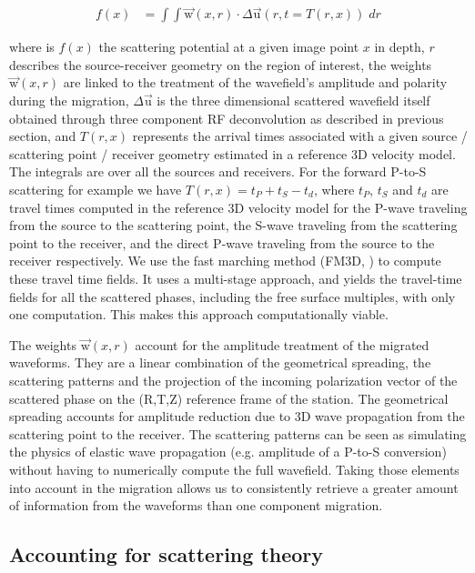 \documentclass[9pt,a4paper]{article}
\numberwithin{equation}{section}
\begin{document}
\begin{multicols}{2}
\begin{align}
  f(x) &= \int\!\!\!\!\int \vec{\text{w}}(x,r) \cdot \Delta\vec{\text{u}}(r,t=T(r,x)) \; dr
  \label{gen}
\end{align}
\vspace{1mm}

\noindent where is $f(x)$ the scattering potential at a given image point $x$ in depth, 
$r$ describes the source-receiver geometry on the region of interest, 
the weights $\vec{\text{w}}(x,r)$ are linked to the treatment of the wavefield’s amplitude and polarity during the migration, 
$\Delta\vec{\text{u}}$ is the three dimensional scattered wavefield itself obtained through three component RF deconvolution as described in previous section, 
and $T(r,x)$ represents the arrival times associated with a given source / scattering point / receiver geometry estimated in a reference 3D velocity model. 
The integrals are over all the sources and receivers.
For the forward P-to-S scattering for example we have $T(r,x) = t_P + t_S - t_d$, where $t_P$, $t_S$ and $t_d$ are travel times computed in the reference 3D velocity model for the P-wave traveling from the source to the scattering point, the S-wave traveling from the scattering point to the receiver, and the direct P-wave traveling  from the source to the receiver respectively. 
We use the fast marching method (FM3D, \cite{deko_gji_06}) to compute these travel time fields. 
It uses a multi-stage approach, and yields the travel-time fields for all the scattered phases, including the free surface multiples, with only one computation. 
This makes this approach computationally viable. 


The weights $\vec{\text{w}}(x,r)$ account for the amplitude treatment of the migrated waveforms. 
They are a linear combination of the geometrical spreading, the scattering patterns and the projection of the incoming polarization vector of the scattered phase on the (R,T,Z) reference frame of the station.
The geometrical spreading accounts for amplitude reduction due to 3D wave propagation from the scattering point to the receiver.
The scattering patterns can be seen as simulating the physics of elastic wave propagation (e.g. amplitude of a P-to-S conversion) without having to numerically compute the full wavefield.
Taking those elements into account in the migration allows us to consistently retrieve a greater amount of information from the waveforms than one component migration.

\subsection{Accounting for scattering theory}


\end{multicols}
\end{document}
